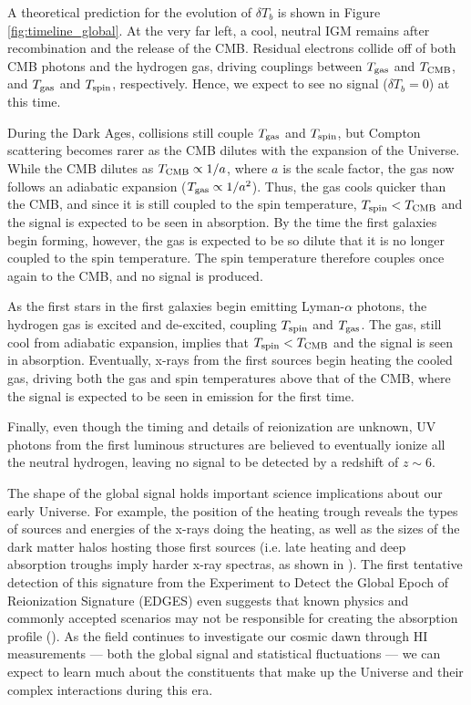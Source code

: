 A theoretical prediction for the evolution of $\delta T_{b}$ is shown in Figure \ref{fig:timeline_global}. At the very far left, a cool, neutral IGM remains after recombination and the release of the CMB. Residual electrons collide off of both CMB photons and the hydrogen gas, driving couplings between $T_{\rm gas}$ and $T_{\rm CMB}$, and $T_{\rm gas}$ and $T_{\rm spin}$, respectively. Hence, we expect to see no signal ($\delta T_{b} = 0$) at this time.

During the Dark Ages, collisions still couple $T_{\rm gas}$ and $T_{\rm spin}$, but Compton scattering becomes rarer as the CMB dilutes with the expansion of the Universe. While the CMB dilutes as $T_{\rm CMB} \propto 1/a$, where $a$ is the scale factor, the gas now follows an adiabatic expansion ($T_{\rm gas} \propto 1/a^{2}$). Thus, the gas cools quicker than the CMB, and since it is still coupled to the spin temperature, $T_{\rm spin} < T_{\rm CMB}$ and the signal is expected to be seen in absorption. By the time the first galaxies begin forming, however, the gas is expected to be so dilute that it is no longer coupled to the spin temperature. The spin temperature therefore couples once again to the CMB, and no signal is produced.

As the first stars in the first galaxies begin emitting Lyman-$\alpha$ photons, the hydrogen gas is excited and de-excited, coupling $T_{\rm spin}$ and $T_{\rm gas}$. The gas, still cool from adiabatic expansion, implies that $T_{\rm spin} < T_{\rm CMB}$ and the signal is seen in absorption. Eventually, x-rays from the first sources begin heating the cooled gas, driving both the gas and spin temperatures above that of the CMB, where the signal is expected to be seen in emission for the first time. 

Finally, even though the timing and details of reionization are unknown, UV photons from the first luminous structures are believed to eventually ionize all the neutral hydrogen, leaving no signal to be detected by a redshift of $z \sim 6$. 

The shape of the global signal holds important science implications about our early Universe. For example, the position of the heating trough reveals the types of sources and energies of the x-rays doing the heating, as well as the sizes of the dark matter halos hosting those first sources (i.e. late heating and deep absorption troughs imply harder x-ray spectras, as shown in \citet{fialkov_et_al2014}). The first tentative detection of this signature from the Experiment to Detect the Global Epoch of Reionization Signature (EDGES) even suggests that known physics and commonly accepted scenarios may not be responsible for creating the absorption profile (\citealt{bowman_et_al2018}). As the field continues to investigate our cosmic dawn through HI measurements --- both the global signal and statistical fluctuations ---  we can expect to learn much about the constituents that make up the Universe and their complex interactions during this era.

